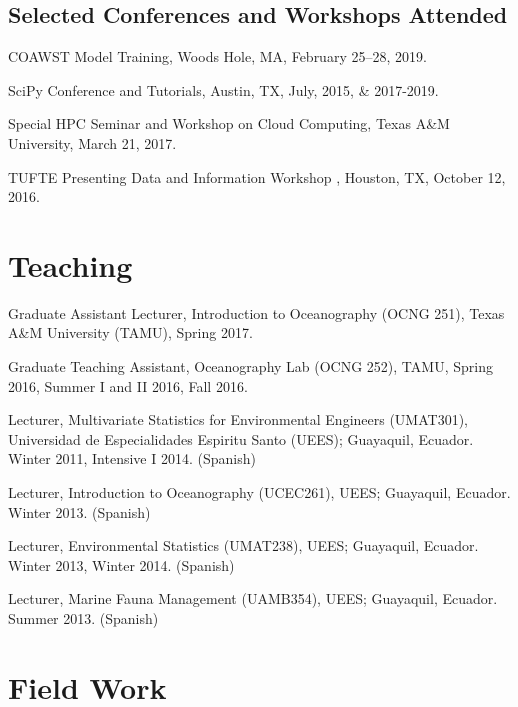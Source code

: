 \documentclass[10pt,letterpaper]{article}
\renewenvironment{itemize}{
  \begin{list}{}{
    \setlength{\leftmargin}{1.5em}
    \setlength{\itemsep}{0.25em}
    \setlength{\parskip}{0pt}
    \setlength{\parsep}{0.25em}
  }
}{
  \end{list}
}
\begin{document}
\subsection*{Selected Conferences and Workshops Attended}

\begin{itemize}

\item COAWST Model Training, Woods Hole, MA, February 25--28, 2019.

\item SciPy Conference and Tutorials, Austin, TX, July, 2015, \& 2017-2019.

\item Special HPC Seminar and Workshop on Cloud Computing, Texas A\&M University, March 21, 2017.

\item TUFTE Presenting Data and Information Workshop , Houston, TX, October 12, 2016.

\end{itemize}


\section*{Teaching}

\begin{itemize}
\item Graduate Assistant Lecturer, Introduction to Oceanography (OCNG 251), Texas A\&M University (TAMU), Spring 2017.
\item Graduate Teaching Assistant, Oceanography Lab (OCNG 252), TAMU, Spring 2016, Summer I and II 2016, Fall 2016.
\item Lecturer, Multivariate Statistics for Environmental Engineers (UMAT301), Universidad de Especialidades Espiritu Santo (UEES); Guayaquil, Ecuador. Winter 2011, Intensive I 2014. (Spanish)
\item Lecturer, Introduction to Oceanography (UCEC261), UEES; Guayaquil, Ecuador. Winter 2013. (Spanish)
\item Lecturer, Environmental Statistics (UMAT238), UEES; Guayaquil, Ecuador. Winter 2013, Winter 2014. (Spanish)
\item Lecturer, Marine Fauna Management (UAMB354), UEES; Guayaquil, Ecuador. Summer 2013.  (Spanish)
\end{itemize}

\section*{Field Work}
\end{document}
